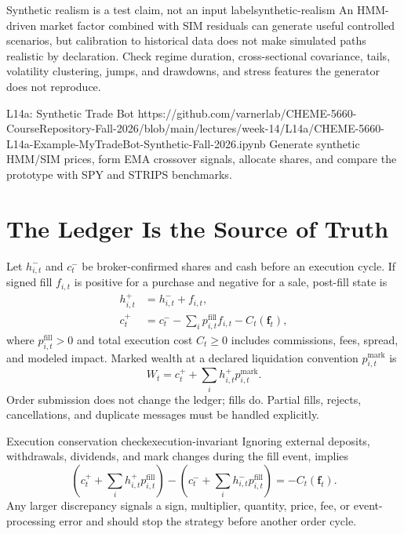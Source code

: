 \documentclass[11pt]{article}
\begin{document}
\begin{remark}{Synthetic realism is a test claim, not an input label}{synthetic-realism}
An HMM-driven market factor combined with SIM residuals can generate useful controlled scenarios, but calibration to historical data does not make simulated paths realistic by declaration. Check regime duration, cross-sectional covariance, tails, volatility clustering, jumps, and drawdowns, and stress features the generator does not reproduce.
\end{remark}

\notebooklink
  {L14a: Synthetic Trade Bot}
  {https://github.com/varnerlab/CHEME-5660-CourseRepository-Fall-2026/blob/main/lectures/week-14/L14a/CHEME-5660-L14a-Example-MyTradeBot-Synthetic-Fall-2026.ipynb}
  {Generate synthetic HMM/SIM prices, form EMA crossover signals, allocate shares, and compare the prototype with SPY and STRIPS benchmarks.}

\section{The Ledger Is the Source of Truth}

Let $h_{i,t}^-$ and $c_t^-$ be broker-confirmed shares and cash before an execution cycle. If signed fill $f_{i,t}$ is positive for a purchase and negative for a sale, post-fill state is
\begin{align}
  \label{eq:fill-ledger}
  h_{i,t}^+&=h_{i,t}^-+f_{i,t},\\
  c_t^+&=c_t^--\sum_i p_{i,t}^{\mathrm{fill}}f_{i,t}
  -C_t(\mathbf f_t),
\end{align}
where $p_{i,t}^{\mathrm{fill}}>0$ and total execution cost $C_t\geq0$ includes commissions, fees, spread, and modeled impact. Marked wealth at a declared liquidation convention $p_{i,t}^{\mathrm{mark}}$ is
\begin{equation}
  \label{eq:marked-wealth}
  W_t=c_t^++\sum_i h_{i,t}^+p_{i,t}^{\mathrm{mark}}.
\end{equation}
Order submission does not change the ledger; fills do. Partial fills, rejects, cancellations, and duplicate messages must be handled explicitly.

\begin{theorem}{Execution conservation check}{execution-invariant}
Ignoring external deposits, withdrawals, dividends, and mark changes during the fill event,  implies
\begin{equation}
  \label{eq:execution-conservation}
  \left(c_t^++\sum_i h_{i,t}^+p_{i,t}^{\mathrm{fill}}\right)
  -\left(c_t^-+\sum_i h_{i,t}^-p_{i,t}^{\mathrm{fill}}\right)
  =-C_t(\mathbf f_t).
\end{equation}
Any larger discrepancy signals a sign, multiplier, quantity, price, fee, or event-processing error and should stop the strategy before another order cycle.
\end{theorem}
\end{document}

